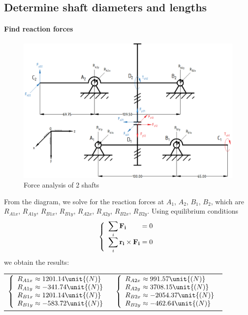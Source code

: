 \subsection{Determine shaft diameters and lengths}

\paragraph{Find reaction forces}

\begin{figure}[ht]
	\centering
	\includegraphics[width=160mm]{shaft.png}
	\caption{Force analysis of 2 shafts}
	\label{force on shaft}
\end{figure}

From the diagram, we solve for the reaction forces at $ A_1 $, $ A_2 $, $ B_1 $, $ B_2 $, which are $ R_{A1x} $, $ R_{A1y} $, $ R_{B1x} $, $ R_{B1y} $, $ R_{A2x} $, $ R_{A2y} $, $ R_{B2x} $, $ R_{B2y} $. Using equilibrium conditions
\[
\left\{ 
\begin{array}{l@{{}={}}l}
\displaystyle\sum_{i} \mathbf{F_{i}} & 0\\
\displaystyle\sum_{i} \mathbf{r_i}\times \mathbf{F_i}& 0\\
\end{array}
\right.
\]
we obtain the results:\vskip2mm
	{\centering
	\begin{tabular}[ht]{p{7cm}p{7cm}}
		$
		\left\{ 
		\begin{array}{l@{{} \approx {}}l}
		R_{A1x} & 1201.14\unit{(N)}\\
		R_{A1y} & -341.74\unit{(N)}\\
		R_{B1x} & 1201.14\unit{(N)}\\
		R_{B1y} & -583.72\unit{(N)}\\
		\end{array}
		\right.
		$ & $
		\left\{ 
		\begin{array}{l@{{} \approx {}}l}
		R_{A2x} & 991.57 \unit{(N)}\\
		R_{A2y} & 3708.15 \unit{(N)}\\
		R_{B2x} & -2054.37 \unit{(N)}\\
		R_{B2y} & -462.64 \unit{(N)}\\
		\end{array}
		\right.
		$
	\end{tabular}}

